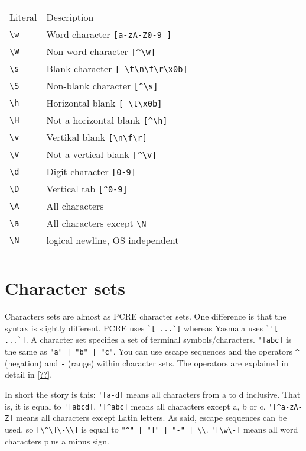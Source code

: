 \documentclass[a4paper]{report}
\begin{document}
\begin{tabular}{p{1cm}p{9.5cm}}
  & \\
Literal     & Description\\
\verb|\w| & Word character \verb|[a-zA-Z0-9_]| \\
\verb|\W| & Non-word character \verb|[^\w]| \\
\verb|\s| & Blank character \verb|[ \t\n\f\r\x0b]| \\
\verb|\S| & Non-blank character \verb|[^\s]|  \\
\verb|\h| & Horizontal blank \verb|[ \t\x0b]|\\
\verb|\H| & Not a horizontal blank \verb|[^\h]|  \\
\verb|\v| & Vertikal blank \verb|[\n\f\r]| \\
\verb|\V| & Not a vertical blank \verb|[^\v]|  \\
\verb|\d| & Digit character \verb|[0-9]| \\
\verb|\D| & Vertical tab \verb|[^0-9]| \\
\Verb|\A|& All characters \\
\verb|\a| & All characters except \verb|\N|\\
\verb|\N| & logical newline, OS independent\\
 & \\
\end{tabular}


\label{CharSet}
\section{Character sets}

Characters sets are almost as PCRE character sets. One difference is that the
syntax is slightly different. PCRE uses \verb|`[ ...`]| whereas Yasmala uses
\verb|`'[ ...`]|. A character set specifies a set of terminal
symbols/characters. \verb|'[abc]| is the same as \verb+"a" | "b" | "c"+. You can
use escape sequences and the operators \verb|^| (negation) and \verb|-| (range)
within character sets. The operators are explained in detail in \ref{??}.

In short the story is this: \verb|'[a-d]| means all characters from a to d
inclusive. That is, it is equal to \verb|'[abcd]|. \verb|'[^abc]| means all
characters except a, b or c. \verb|'[^a-zA-Z]| means all characters except Latin
letters. As said, escape sequences can be used, so \verb|[\^\]\-\\]| is equal to
\verb+"^" | "]" | "-" | \\+. \verb|'[\w\-]| means all word characters plus a
minus sign.
\end{document}
